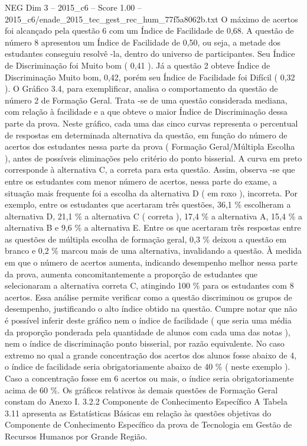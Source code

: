 \begin{textsample}{NEG Dim 3 – 2015\_c6 – Score 1.00 – 2015\_c6/enade\_2015\_tec\_gest\_rec\_hum\_77f5a8062b.txt}
O máximo de acertos foi alcançado pela questão 6 com um Índice de Facilidade de 0,68.
A questão de número 8 apresentou um Índice de Facilidade de 0,50, ou seja, a metade dos estudantes conseguiu resolvê -la, dentro do universo de participantes.
Seu Índice de Discriminação foi Muito bom ( 0,41 ).
Já a questão 2 obteve Índice de Discriminação Muito bom, 0,42, porém seu Índice de Facilidade foi Difícil ( 0,32 ).
O Gráfico 3.4, para exemplificar, analisa o comportamento da questão de número 2 de Formação Geral.
Trata -se de uma questão considerada mediana, com relação à facilidade e a que obteve o maior Índice de Discriminação dessa parte da prova.
Neste gráfico, cada uma das cinco curvas representa o percentual de respostas em determinada alternativa da questão, em função do número de acertos dos estudantes nessa parte da prova ( Formação Geral/Múltipla Escolha ), antes de possíveis eliminações pelo critério do ponto bisserial.
A curva em preto corresponde à alternativa C, a correta para esta questão.
Assim, observa -se que entre os estudantes com menor número de acertos, nessa parte do exame, a situação mais frequente foi a escolha da alternativa D ( em roxo ), incorreta.
Por exemplo, entre os estudantes que acertaram três questões, 36,1 \% escolheram a alternativa D, 21,1 \% a alternativa C ( correta ), 17,4 \% a alternativa A, 15,4 \% a alternativa B e 9,6 \% a alternativa E.
Entre os que acertaram três respostas entre as questões de múltipla escolha de formação geral, 0,3 \% deixou a questão em branco e 0,2 \% marcou mais de uma alternativa, invalidando a questão.
À medida em que o número de acertos aumenta, indicando desempenho melhor nessa parte da prova, aumenta concomitantemente a proporção de estudantes que selecionaram a alternativa correta C, atingindo 100 \% para os estudantes com 8 acertos.
Essa análise permite verificar como a questão discriminou os grupos de desempenho, justificando o alto índice obtido na questão.
Cumpre notar que não é possível inferir deste gráfico nem o índice de facilidade ( que seria uma média da proporção ponderada pela quantidade de alunos com cada uma das notas ), nem o índice de discriminação ponto bisserial, por razão equivalente.
No caso extremo no qual a grande concentração dos acertos dos alunos fosse abaixo de 4, o índice de facilidade seria obrigatoriamente abaixo de 40 \% ( neste exemplo ).
Caso a concentração fosse em 6 acertos ou mais, o índice seria obrigatoriamente acima de 60 \%.
Os gráficos relativos às demais questões de Formação Geral constam do Anexo I. 3.2.2 Componente de Conhecimento Específico A Tabela 3.11 apresenta as Estatísticas Básicas em relação às questões objetivas do Componente de Conhecimento Específico da prova de Tecnologia em Gestão de Recursos Humanos por Grande Região.

\end{textsample}
